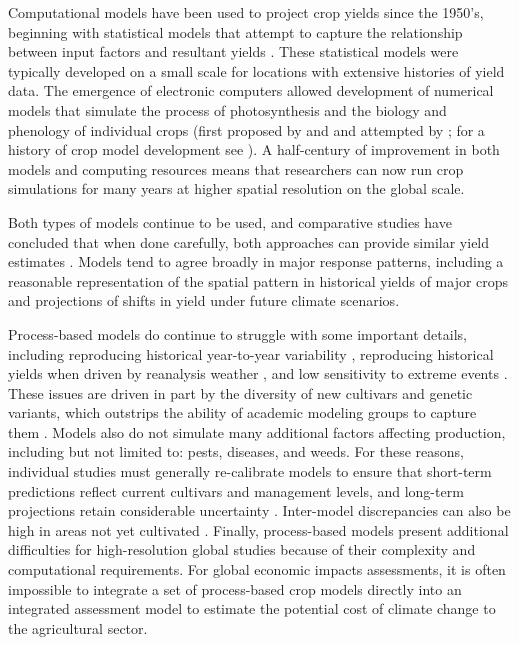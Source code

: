 \documentclass[gmd, manuscript]{copernicus} %
\begin{document}
Computational models have been used to project crop yields since the 1950's, beginning with statistical models  that attempt to capture the relationship between input factors and resultant yields \citep[e.g.][]{Heady57, Heady61}. These statistical models were typically developed on a small scale for locations with extensive histories of yield data. The emergence of electronic computers allowed development of numerical models that simulate the process of photosynthesis and the biology and phenology of individual crops (first proposed by \citet{wit58} and \citet{Duncan67} and attempted by \citet{Duncan72}; for a history of crop model development see \citet{Rosenzweig2014}). A half-century of improvement in both models and computing resources means that researchers can now run crop simulations for many years at higher spatial resolution on the global scale. 

Both types of models continue to be used, and comparative studies have concluded that when done carefully, both approaches can provide similar yield estimates \citep[e.g.][]{Lobell2010, Moore2017, Roberts2017, zhao2017}. Models tend to agree broadly in major response patterns, including a reasonable representation of the spatial pattern in historical yields of major crops \citep[e.g.][]{Elliott2015, muller_global_2017} and projections of shifts in yield under future climate scenarios.

Process-based models do continue to struggle with some important details, including reproducing historical year-to-year variability \citep[e.g.][]{muller_global_2017}, reproducing historical yields when driven by reanalysis weather \citep[e.g.][]{Glotter14}, and low sensitivity to extreme events \citep[e.g.][]{Glotter15, Jag2018, schewe2019}. These issues are driven in part by the diversity of new cultivars and genetic variants, which outstrips the ability of academic modeling groups to capture them \citep[e.g.][]{JONES2017b}. Models also do not simulate many additional factors affecting production, including but not limited to: pests, diseases, and weeds. For these reasons, individual studies must generally re-calibrate models to ensure that short-term predictions reflect current cultivars and management levels, and long-term projections retain considerable uncertainty \citep{WOLF2002217, JAGTAP200273, Iizumi2010, ANGULO201332, Asseng2013, Asseng2015}. Inter-model discrepancies can also be high in areas not yet cultivated \citep[e.g.][]{Challinor2014, WHITE2011357}. Finally, process-based models present additional difficulties for high-resolution global studies because of their complexity and computational requirements. For global economic impacts assessments, it is often impossible to integrate a set of process-based crop models directly into an integrated assessment model to estimate the potential cost of climate change to the agricultural sector.
\end{document}

